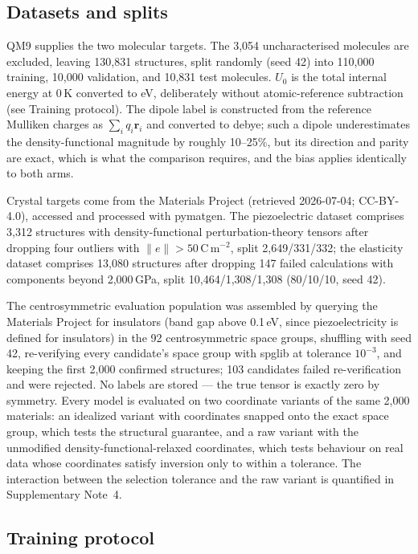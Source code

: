 \subsection*{Datasets and splits}

QM9\cite{ramakrishnan2014qm9} supplies the two molecular targets. The 3,054 uncharacterised molecules are excluded, leaving 130,831 structures, split randomly (seed 42) into 110,000 training, 10,000 validation, and 10,831 test molecules. $U_0$ is the total internal energy at 0\,K converted to eV, deliberately without atomic-reference subtraction (see Training protocol). The dipole label is constructed from the reference Mulliken charges as $\sum_i q_i \mathbf{r}_i$ and converted to debye; such a dipole underestimates the density-functional magnitude by roughly 10--25\%, but its direction and parity are exact, which is what the comparison requires, and the bias applies identically to both arms.

Crystal targets come from the Materials Project (retrieved 2026-07-04; CC-BY-4.0), accessed and processed with pymatgen\cite{ong2013pymatgen}. The piezoelectric dataset\cite{dejong2015piezo} comprises 3,312 structures with density-functional perturbation-theory tensors after dropping four outliers with $\lVert e \rVert > 50$\,C\,m$^{-2}$, split 2,649/331/332; the elasticity dataset comprises 13,080 structures after dropping 147 failed calculations with components beyond 2,000\,GPa, split 10,464/1,308/1,308 (80/10/10, seed 42).

The centrosymmetric evaluation population was assembled by querying the Materials Project for insulators (band gap above 0.1\,eV, since piezoelectricity is defined for insulators) in the 92 centrosymmetric space groups, shuffling with seed 42, re-verifying every candidate's space group with spglib at tolerance $10^{-3}$, and keeping the first 2,000 confirmed structures; 103 candidates failed re-verification and were rejected. No labels are stored --- the true tensor is exactly zero by symmetry. Every model is evaluated on two coordinate variants of the same 2,000 materials: an idealized variant with coordinates snapped onto the exact space group, which tests the structural guarantee, and a raw variant with the unmodified density-functional-relaxed coordinates, which tests behaviour on real data whose coordinates satisfy inversion only to within a tolerance. The interaction between the selection tolerance and the raw variant is quantified in Supplementary Note~4.

\subsection*{Training protocol}


